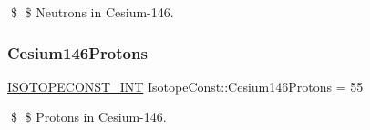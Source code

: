 \$ \$ Neutrons in Cesium-\/146. \mbox{\label{group___isotope_const-_cesium-_cs146_ga27c7dfe94cc61951750cc6db3a7dd293}} 
\subsubsection{\texorpdfstring{Cesium146\+Protons}{Cesium146Protons}}
{\footnotesize\ttfamily \mbox{\hyperlink{group___isotope_const-_macros_ga5f18360b3e99483a35c32d789e62621c}{I\+S\+O\+T\+O\+P\+E\+C\+O\+N\+S\+T\+\_\+\+I\+NT}} Isotope\+Const\+::\+Cesium146\+Protons = 55}

\$ \$ Protons in Cesium-\/146. 